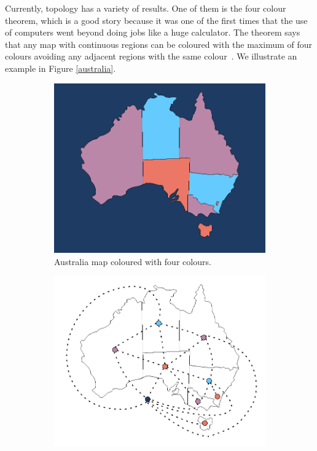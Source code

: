 \pagebreak

Currently, topology has a variety of results. One of them is the four colour
theorem, which is a good story because it was one of the first times that the
use of computers went beyond doing jobs like a huge calculator. The theorem
says that any map with continuous regions can be coloured with the maximum of
four colours avoiding any adjacent regions with the same
colour~\cite{4colores}.  We illustrate an example in Figure \ref{australia}.

\begin{figure}[h]
  \centering
  \begin{subfigure}[b]{0.28\linewidth}
    \includegraphics[width=\linewidth]{3/img/4_colors_australia_mapa}
    \caption{Australia map coloured with four colours.}
  \end{subfigure}
    \begin{subfigure}[b]{0.28\linewidth}
    \includegraphics[width=\linewidth]{3/img/4_colors_australia_mapa_y_grafo}

\end{subfigure}
\end{figure}
